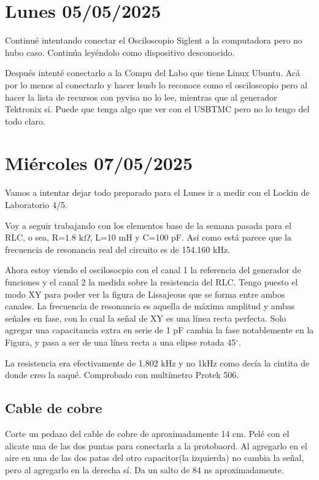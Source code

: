 \section{Lunes 05/05/2025}
Continué intentando conectar el Osciloscopio Siglent a la computadora pero no hubo caso. Continúa leyéndolo como dispositivo desconocido.

Después intenté conectarlo a la Compu del Labo que tiene Linux Ubuntu. Acá por lo menos al conectarlo y hacer lsusb lo reconoce como el osciloscopio pero al hacer la lista de recursos con pyvisa no lo lee, mientras que al generador Tektronix sí. Puede que tenga algo que ver con el USBTMC pero no lo tengo del todo claro. 

\section{Miércoles 07/05/2025}
Vamos a intentar dejar todo preparado para el Lunes ir a medir con el Lockin de Laboratorio 4/5.

Voy a seguir trabajando con los elementos base de la semana pasada para el RLC, o sea, R=$1.8$ k$\Omega$, L=10 mH y C=100 pF. Así como está parece que la frecuencia de resonancia real del circuito es de 154.160 kHz.

Ahora estoy viendo el oscilosocpio con el canal 1 la referencia del generador de funciones y el canal 2 la medida sobre la resistencia del RLC. Tengo puesto el modo XY para poder ver la figura de Lissajeous que se forma entre ambos canales. La frecuencia de resonancia es aquella de máxima amplitud y ambas señales en fase, con lo cual la señal de XY es una línea recta perfecta. Solo agregar una capacitancia extra en serie de 1 pF cambia la fase notablemente en la Figura, y pasa a ser de una línea recta a una elipse rotada 45$^\circ$. 

La resistencia era efectivamente de 1.802 kHz y no 1kHz como decía la cintita de donde creo la saqué. Comprobado con multímetro Protek 506. 


\subsection*{Cable de cobre}
Corte un pedazo del cable de cobre de aproximadamente 14 cm. Pelé con el alicate una de las dos puntas para conectarla a la protobaord. Al agregarlo en el aire en una de las dos patas del otro capacitor(la izquierda) no cambia la señal, pero al agregarlo en la derecha sí. Da un salto de 84 ns aproximadamente.

